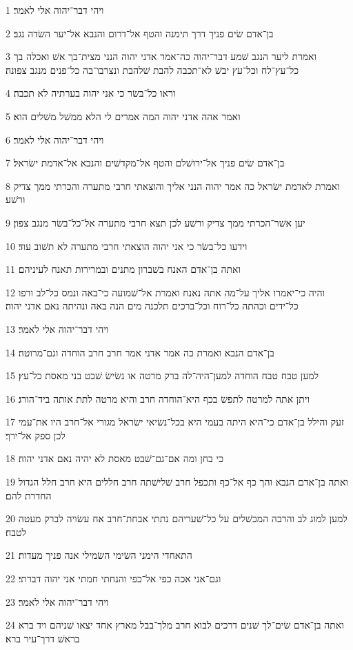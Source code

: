 \par 1 ויהי דבר־יהוה אלי לאמר׃
\par 2 בן־אדם שׂים פניך דרך תימנה והטף אל־דרום והנבא אל־יער השׂדה נגב׃
\par 3 ואמרת ליער הנגב שׁמע דבר־יהוה כה־אמר אדני יהוה הנני מצית־בך אשׁ ואכלה בך כל־עץ־לח וכל־עץ יבשׁ לא־תכבה להבת שׁלהבת ונצרבו־בה כל־פנים מנגב צפונה׃
\par 4 וראו כל־בשׂר כי אני יהוה בערתיה לא תכבה׃
\par 5 ואמר אהה אדני יהוה המה אמרים לי הלא ממשׁל משׁלים הוא׃
\par 6 ויהי דבר־יהוה אלי לאמר׃
\par 7 בן־אדם שׂים פניך אל־ירושׁלם והטף אל־מקדשׁים והנבא אל־אדמת ישׂראל׃
\par 8 ואמרת לאדמת ישׂראל כה אמר יהוה הנני אליך והוצאתי חרבי מתערה והכרתי ממך צדיק ורשׁע׃
\par 9 יען אשׁר־הכרתי ממך צדיק ורשׁע לכן תצא חרבי מתערה אל־כל־בשׂר מנגב צפון׃
\par 10 וידעו כל־בשׂר כי אני יהוה הוצאתי חרבי מתערה לא תשׁוב עוד׃
\par 11 ואתה בן־אדם האנח בשׁברון מתנים ובמרירות תאנח לעיניהם׃
\par 12 והיה כי־יאמרו אליך על־מה אתה נאנח ואמרת אל־שׁמועה כי־באה ונמס כל־לב ורפו כל־ידים וכהתה כל־רוח וכל־ברכים תלכנה מים הנה באה ונהיתה נאם אדני יהוה׃
\par 13 ויהי דבר־יהוה אלי לאמר׃
\par 14 בן־אדם הנבא ואמרת כה אמר אדני אמר חרב חרב הוחדה וגם־מרוטה׃
\par 15 למען טבח טבח הוחדה למען־היה־לה ברק מרטה או נשׂישׂ שׁבט בני מאסת כל־עץ׃
\par 16 ויתן אתה למרטה לתפשׂ בכף היא־הוחדה חרב והיא מרטה לתת אותה ביד־הורג׃
\par 17 זעק והילל בן־אדם כי־היא היתה בעמי היא בכל־נשׂיאי ישׂראל מגורי אל־חרב היו את־עמי לכן ספק אל־ירך׃
\par 18 כי בחן ומה אם־גם־שׁבט מאסת לא יהיה נאם אדני יהוה׃
\par 19 ואתה בן־אדם הנבא והך כף אל־כף ותכפל חרב שׁלישׁתה חרב חללים היא חרב חלל הגדול החדרת להם׃
\par 20 למען למוג לב והרבה המכשׁלים על כל־שׁעריהם נתתי אבחת־חרב אח עשׂויה לברק מעטה לטבח׃
\par 21 התאחדי הימני השׂימי השׂמילי אנה פניך מעדות׃
\par 22 וגם־אני אכה כפי אל־כפי והנחתי חמתי אני יהוה דברתי׃
\par 23 ויהי דבר־יהוה אלי לאמר׃
\par 24 ואתה בן־אדם שׂים־לך שׁנים דרכים לבוא חרב מלך־בבל מארץ אחד יצאו שׁניהם ויד ברא בראשׁ דרך־עיר ברא׃
